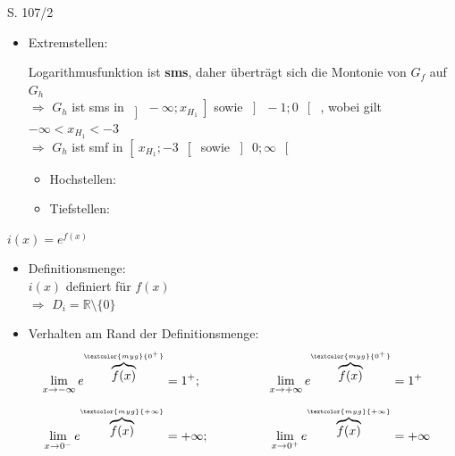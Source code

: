 \begin{Exercise}{S. 107/2}{}
\begin{enumerate}[label=\arabic*.,leftmargin=*]
{\begin{itemize}[leftmargin=*]
{                }
            \item Extremstellen: \\[1.0ex]{
                Logarithmusfunktion ist \textbf{sms}, daher überträgt sich die Montonie von $G_{f}$ auf $G_{h}$\\[1.0ex]
                $\Rightarrow$ \quad $G_{h}$ ist sms in $\left] \ -\infty; x_{H_{1}} \ \right]$ sowie $\left] \ -1; 0 \ \right[$ \quad, wobei gilt $-\infty < x_{H_{1}} < -3$ \\[1.0ex]
                $\Rightarrow$ \quad $G_{h}$ ist smf in $\left[ \ x_{H_{1}} ; -3 \ \right[$ sowie $\left] \ 0; \infty \ \right[$ \\[-2.0ex]
                \begin{itemize}
                    \item Hochstellen: 
                    \item Tiefstellen: \\
                \end{itemize}
                }
        \end{itemize}
        $i(x) =  e^{f(x)}$ \\[-3.0ex] 
        \begin{itemize}[leftmargin=*]
            \item Definitionsmenge: \\[1.0ex]{
                $i(x)$ definiert für $f(x)$\\[1.0ex]
                $\Rightarrow$ \quad $D_{i} = \mathbb{R} \setminus \{0\}$\\[-2.0ex]
                }
            \item Verhalten am Rand der Definitionsmenge: \\[-2.0ex]{
                \begin{align*}
                    \lim\limits_{x \to -\infty} e^{\overbrace{f(x)}^{\textcolor{myg}{0^{+}}}} &= 1^{+}; \qquad \qquad &\lim\limits_{x \to +\infty} e^{\overbrace{f(x)}^{\textcolor{myg}{0^{+}}}} &= 1^{+} && \\[1.5ex]
                    \lim\limits_{x \to 0^{-}} e^{\overbrace{f(x)}^{\textcolor{myg}{+\infty}}} &= + \infty; \qquad \qquad &\lim\limits_{x \to 0^{+}} e^{\overbrace{f(x)}^{\textcolor{myg}{+\infty}}} &= + \infty && \\[-2.0ex]
                \end{align*}
}
\end{itemize}}
\end{enumerate}
\end{Exercise}
